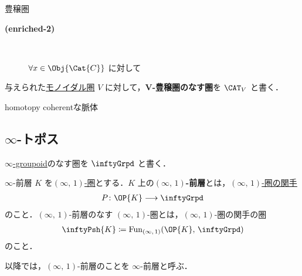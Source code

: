 \documentclass[TQFT_main]{subfiles}
\begin{document}
\begin{mydef}[label=def:enriched,breakable]{豊穣圏}
\begin{description}
        \item[\textbf{(enriched-2)}]　
        
        $\forall x \in \Obj{\Cat{C}}$ に対して
        \begin{center}
        \end{center}
        
    \end{description}
    
\end{mydef}

与えられた\hyperref[def:monoidal-category]{モノイダル圏} $V$ に対して，\textbf{$\bm{V}$-豊穣圏のなす圏}を $\CAT_{V}$ と書く．


\begin{mydef}[label=def:nerve-hc]{homotopy coherentな脈体}
    
\end{mydef}


\subsection{$\infty$-トポス}

\hyperref[def:infinity-1]{$\infty$-groupoid}のなす圏を $\inftyGrpd$ と書く．

\begin{mydef}[label=def:infinity-presheaf]{$\infty$-前層}
    $K$ を\hyperref[def:infinity-1]{$(\infty,\, 1)$-圏}とする．$K$ 上の\textbf{$(\infty,\, 1)$-前層}とは，\hyperref[def:infinity-1]{$(\infty,\, 1)$-圏の関手}
    \begin{align}
        P \colon \OP{K} \lto \inftyGrpd
    \end{align}
    のこと．$(\infty,\, 1)$-前層のなす $(\infty,\, 1)$-圏とは，$(\infty,\, 1)$-圏の関手の圏
    \begin{align}
        \inftyPsh{K} \coloneqq \mathrm{Fun}_{(\infty,\, 1)} (\OP{K},\, \inftyGrpd)
    \end{align}
    のこと．
\end{mydef}

\begin{marker}
    以降では，$(\infty,\, 1)$-前層のことを $\infty$-前層と呼ぶ．
\end{marker}
\end{document}
